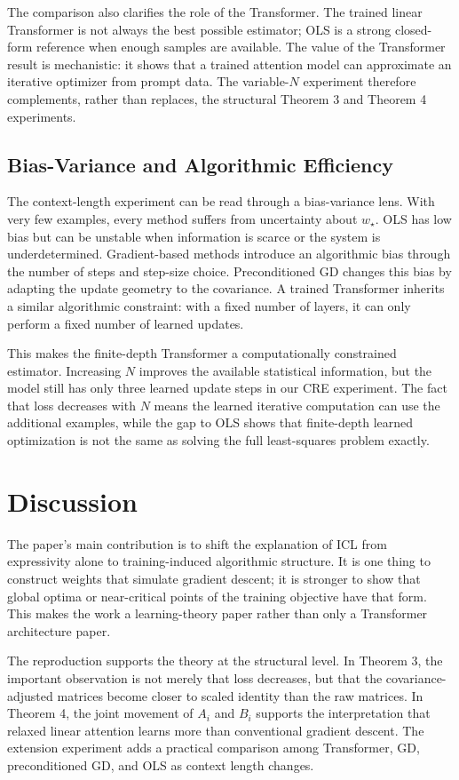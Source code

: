\documentclass[conference]{IEEEtran}
\newcommand{\wstar}{w_\star}
\begin{document}
The comparison also clarifies the role of the Transformer. The trained linear Transformer is not always the best possible estimator; OLS is a strong closed-form reference when enough samples are available. The value of the Transformer result is mechanistic: it shows that a trained attention model can approximate an iterative optimizer from prompt data. The variable-$N$ experiment therefore complements, rather than replaces, the structural Theorem 3 and Theorem 4 experiments.

\subsection{Bias-Variance and Algorithmic Efficiency}
The context-length experiment can be read through a bias-variance lens. With very few examples, every method suffers from uncertainty about $\wstar$. OLS has low bias but can be unstable when information is scarce or the system is underdetermined. Gradient-based methods introduce an algorithmic bias through the number of steps and step-size choice. Preconditioned GD changes this bias by adapting the update geometry to the covariance. A trained Transformer inherits a similar algorithmic constraint: with a fixed number of layers, it can only perform a fixed number of learned updates.

This makes the finite-depth Transformer a computationally constrained estimator. Increasing $N$ improves the available statistical information, but the model still has only three learned update steps in our CRE experiment. The fact that loss decreases with $N$ means the learned iterative computation can use the additional examples, while the gap to OLS shows that finite-depth learned optimization is not the same as solving the full least-squares problem exactly.

\section{Discussion}
The paper's main contribution is to shift the explanation of ICL from expressivity alone to training-induced algorithmic structure. It is one thing to construct weights that simulate gradient descent; it is stronger to show that global optima or near-critical points of the training objective have that form. This makes the work a learning-theory paper rather than only a Transformer architecture paper.

The reproduction supports the theory at the structural level. In Theorem 3, the important observation is not merely that loss decreases, but that the covariance-adjusted matrices become closer to scaled identity than the raw matrices. In Theorem 4, the joint movement of $A_i$ and $B_i$ supports the interpretation that relaxed linear attention learns more than conventional gradient descent. The extension experiment adds a practical comparison among Transformer, GD, preconditioned GD, and OLS as context length changes.
\end{document}
